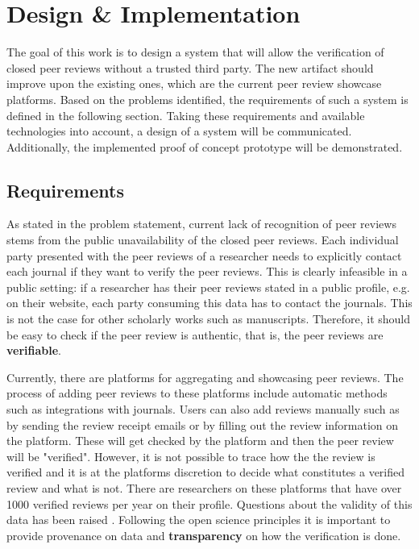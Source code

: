 
\chapter{Design \& Implementation}\label{chapter:design}

The goal of this work is to design a system that will allow the verification of closed peer reviews without a trusted third party. The new artifact should improve upon the existing ones, which are the current peer review showcase platforms. Based on the problems identified, the requirements of such a system is defined in the following section. Taking these requirements and available technologies into account, a design of a system will be communicated. Additionally, the implemented proof of concept prototype will be demonstrated.

\section{Requirements} \label{sec:requirements}

As stated in the problem statement, current lack of recognition of peer reviews stems from the public unavailability of the closed peer reviews. Each individual party presented with the peer reviews of a researcher needs to explicitly contact each journal if they want to verify the peer reviews. This is clearly infeasible in a public setting: if a researcher has their peer reviews stated in a public profile, e.g. on their website, each party consuming this data has to contact the journals. This is not the case for other scholarly works such as manuscripts. Therefore, it should be easy to check if the peer review is authentic, that is, the peer reviews are \textbf{verifiable}.

Currently, there are platforms for aggregating and showcasing peer reviews. The process of adding peer reviews to these platforms include automatic methods such as integrations with journals. Users can also add reviews manually such as by sending the review receipt emails or by filling out the review information on the platform. These will get checked by the platform and then the peer review will be "verified". However, it is not possible to trace how the the review is verified and it is at the platforms discretion to decide what constitutes a verified review and what is not. There are researchers on these platforms that have over 1000 verified reviews per year on their profile. Questions about the validity of this data has been raised \parencite{TeixeiradaSilva.2020, TeixeiradaSilva.2017, TeixeiradaSilva.2019}. Following the open science principles it is important to provide provenance on data and \textbf{transparency} on how the verification is done.

